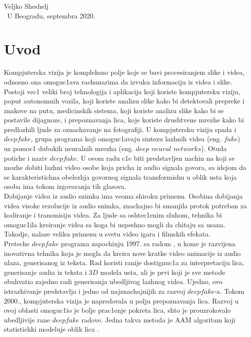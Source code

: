 \documentclass[a4paper, openany, oneside, 11pt]{book}
\begin{document}
\hfill Veljko Sheshelj \\ 
\mbox{ }\hfill  U Beogradu, septembra 2020.

\newpage
\tableofcontents



\chapter*{Uvod} 
Kompjuterska vizija je kompleksno polje koje se bavi procesiranjem slike i videa, odnosno ona omoguc1ava rachunarima da izvuku informaciju iz videa i slike. Postoji vec1 veliki broj tehnologija i aplikacija koji koriste kompjutersku viziju, poput autonomnih vozila, koji koriste analizu slike kako bi detektovali prepreke i znakove na putu, medicinskih sistema, koji koriste analizu slike kako bi se postavile dijagnoze, i prepoznavanja lica, koje koriste drushtvene mrezhe kako bi predlozhili ljude za oznachavanje na fotografiji. U kompjutersku viziju spada i $deepfake$, grupa programa koji omoguc1avaju sintezu lazhnih videa (eng. $fake$) uz pomoc1 dubokih neuralnih mrezha (eng. $deep$ $neural$ $networks$). Otuda potiche i naziv $deepfake$. U ovom radu c1e biti predstavljen nachin na koji se mozhe dobiti lazhni video osobe koja pricha iz audio signala govora, sa idejom da se karakteristichna obelezhja govornog signala transformishu u oblik usta koja osoba ima tokom izgovaranja tih glasova.\\
Dobijanje videa iz audio snimka ima veoma shiroku primenu. Osobina dobijanja videa visoke rezolucije iz audio snimka, znachajno bi smanjila protok potreban za kodiranje i transmisiju videa. Za ljude sa oshtec1enim sluhom, tehnika bi omoguc1ila kreiranje videa sa koga bi uspeshno mogli da chitaju sa usana. Takodje, nalaze veliku primenu u svetu video igara i filmskih efekata.\\
Preteche $deepfake$ programa zapochinju 1997. sa radom \cite{deepfake1}, u kome je razvijena inovativna tehnika koja je mogla da kreira nove kratke video animacije iz audio ulaza, generisanog iz teksta. Rad koristi ranije dostignuc1a za interpretaciju lica, generisanje audia iz teksta i $3D$ modela usta, ali je prvi koji je sve metode obuhvatio zajedno radi generisanja ubedljivog lazhnog videa. Ujedno, ovo istra\-zhivanje predstavlja i jedno od najznachajnijih za razvoj $deepfake$-a. Tokom 2000., kompjuterska vizija je napredovala u polju prepoznavanja lica. Razvoj u ovoj oblasti omoguc1io je bolje prac1enje pokreta lica, shto je prouzrokovalo ubedljivije rane $deepfake$ radove. Jedna takva metoda je \acrshort{AAM} algoritam koji statistichki modeluje oblik lica \cite{AAM}.\\ 
\end{document}
